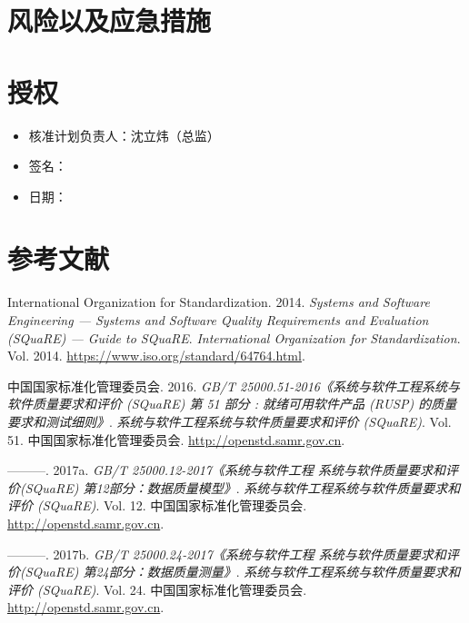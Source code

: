 \documentclass[hyperref, a4paper]{ctexart}
\providecommand{\tightlist}{%
  \setlength{\itemsep}{0pt}\setlength{\parskip}{0pt}}
\begin{document}
\hypertarget{ux98ceux9669ux4ee5ux53caux5e94ux6025ux63aaux65bd}{%
\section{风险以及应急措施}\label{ux98ceux9669ux4ee5ux53caux5e94ux6025ux63aaux65bd}}

\hypertarget{ux6388ux6743}{%
\section{授权}\label{ux6388ux6743}}

\begin{itemize}
\tightlist
\item
  核准计划负责人：沈立炜（总监）
\item
  签名：
\item
  日期：
\end{itemize}

\pagebreak

\hypertarget{ux53c2ux8003ux6587ux732e}{%
\section*{参考文献}\label{ux53c2ux8003ux6587ux732e}}

\hypertarget{refs}{}
\leavevmode\hypertarget{ref-innovativeInternationalisation}{}%
International Organization for Standardization. 2014. \emph{Systems and
Software Engineering --- Systems and Software Quality Requirements and
Evaluation (SQuaRE) --- Guide to SQuaRE}. \emph{International
Organization for Standardization}. Vol. 2014.
\url{https://www.iso.org/standard/64764.html}.

\leavevmode\hypertarget{ref-innovative1}{}%
中国国家标准化管理委员会. 2016. \emph{GB/T
25000.51-2016《系统与软件工程系统与软件质量要求和评价 (SQuaRE) 第 51
部分 : 就绪可用软件产品 (RUSP) 的质量要求和测试细则》}.
\emph{系统与软件工程系统与软件质量要求和评价 (SQuaRE)}. Vol. 51.
中国国家标准化管理委员会. \url{http://openstd.samr.gov.cn}.

\leavevmode\hypertarget{ref-innovative3}{}%
---------. 2017a. \emph{GB/T 25000.12-2017《系统与软件工程
系统与软件质量要求和评价(SQuaRE) 第12部分：数据质量模型》}.
\emph{系统与软件工程系统与软件质量要求和评价 (SQuaRE)}. Vol. 12.
中国国家标准化管理委员会. \url{http://openstd.samr.gov.cn}.

\leavevmode\hypertarget{ref-innovative4}{}%
---------. 2017b. \emph{GB/T 25000.24-2017《系统与软件工程
系统与软件质量要求和评价(SQuaRE) 第24部分：数据质量测量》}.
\emph{系统与软件工程系统与软件质量要求和评价 (SQuaRE)}. Vol. 24.
中国国家标准化管理委员会. \url{http://openstd.samr.gov.cn}.
\end{document}
